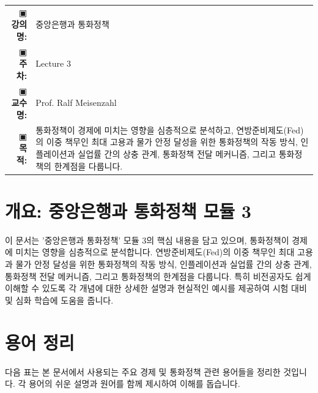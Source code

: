 \documentclass[11pt,a4paper]{article}
\makeatletter
\theoremstyle{definition}
\newcommand{\metainfo}[4]{
\begin{tcolorbox}[
    colback=lightpurple,
    colframe=darkpurple,
    boxrule=1pt,
    arc=2mm,
    left=10pt,
    right=10pt,
    top=8pt,
    bottom=8pt
]
\begin{tabular}{@{}rl@{}}
▣ \textbf{강의명:} & #1 \\[0.3em]
▣ \textbf{주차:} & #2 \\[0.3em]
▣ \textbf{교수명:} & #3 \\[0.3em]
▣ \textbf{목적:} & \begin{minipage}[t]{0.75\textwidth}#4\end{minipage}
\end{tabular}
\end{tcolorbox}
}
\makeatother
\begin{document}
\thispagestyle{firstpage}

\metainfo{중앙은행과 통화정책}{Lecture 3}{Prof. Ralf Meisenzahl}{통화정책이 경제에 미치는 영향을 심층적으로 분석하고, 연방준비제도(Fed)의 이중 책무인 최대 고용과 물가 안정 달성을 위한 통화정책의 작동 방식, 인플레이션과 실업률 간의 상충 관계, 통화정책 전달 메커니즘, 그리고 통화정책의 한계점을 다룹니다.}

\tableofcontents

\newpage
\section{개요: 중앙은행과 통화정책 모듈 3}

이 문서는 '중앙은행과 통화정책' 모듈 3의 핵심 내용을 담고 있으며, 통화정책이 경제에 미치는 영향을 심층적으로 분석합니다. 연방준비제도(Fed)의 이중 책무인 최대 고용과 물가 안정 달성을 위한 통화정책의 작동 방식, 인플레이션과 실업률 간의 상충 관계, 통화정책 전달 메커니즘, 그리고 통화정책의 한계점을 다룹니다. 특히 비전공자도 쉽게 이해할 수 있도록 각 개념에 대한 상세한 설명과 현실적인 예시를 제공하여 시험 대비 및 심화 학습에 도움을 줍니다.

\newpage
\section{용어 정리}

다음 표는 본 문서에서 사용되는 주요 경제 및 통화정책 관련 용어들을 정리한 것입니다. 각 용어의 쉬운 설명과 원어를 함께 제시하여 이해를 돕습니다.
\end{document}
